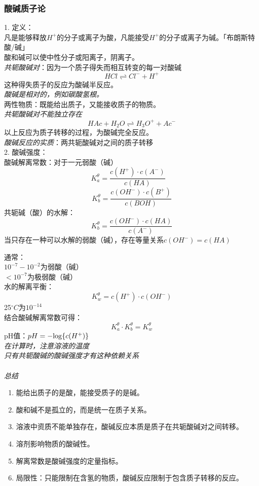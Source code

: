 \documentclass[utf8,a4paper,12pt]{ctexart}
\begin{document}
\subsubsection{酸碱质子论}
{\large 1. 定义：}\\
凡是能够释放$H^{+}$的分子或离子为酸，凡能接受$H^{+}$的分子或离子为碱。「布朗斯特酸/碱」\\
酸和碱可以使中性分子或阳离子，阴离子。\\
\emph{共轭酸碱对}：因为一个质子得失而相互转变的每一对酸碱
\[
HCl \rightleftharpoons Cl^{-} + H^{+}
\]
这种得失质子的反应为酸碱半反应。\\
\emph{酸碱是相对的，例如碳酸氢根。}\\
两性物质：既能给出质子，又能接收质子的物质。\\
\emph{共轭酸碱对不能独立存在}
\[
HAc + H_{2}O \rightleftharpoons H_{3}O^{+} + Ac^{-}
\]
以上反应为质子转移的过程，为酸碱完全反应。\\
\emph{酸碱反应的实质}：两共轭酸碱对之间的质子转移\\
{\large 2. 酸碱强度：}\\
酸碱解离常数：对于一元弱酸（碱）
\begin{equation}
K^{\theta}_{a} = \frac{c(H^{+})\cdot c(A^{-})}{c(HA)}\quad
\end{equation}
\[
K^{\theta}_{b} = \frac{c(OH^{-})\cdot c(B^{+})}{c(BOH)}
\]
共轭碱（酸）的水解：
\[
K^{\theta}_{b} = \frac{c(OH^{-})\cdot c(HA)}{c(A^{-})}
\]
当只存在一种可以水解的弱酸（碱），存在等量关系$c(OH^{-}) = c(HA)$

通常：\\
$10^{-7} - 10^{-2}$为弱酸（碱）\\
$<10^{-7}$为极弱酸（碱）\\
水的解离平衡：
\begin{equation}
K^{\theta}_{w} = c(H^{+})\cdot c(OH^{-})
\end{equation}
25$^{\circ}C$为$10^{-14}$\\
结合酸碱解离常数可得：
\begin{equation}
K^{\theta}_{a} \cdot K^{\theta}_{b} = K^{\theta}_{w}
\end{equation}
pH值：$pH = -{\rm log}\{c(H^{+})\}$\\
\emph{在计算时，注意溶液的温度\\只有共轭酸碱的酸碱强度才有这种依赖关系}\\\\
\emph{总结}
\begin{enumerate}[1)]
\item 能给出质子的是酸，能接受质子的是碱。
\item 酸和碱不是孤立的，而是统一在质子关系。
\item 溶液中资质不能单独存在，酸碱反应本质是质子在共轭酸碱对之间转移。
\item 溶剂影响物质的酸碱性。
\item 解离常数是酸碱强度的定量指标。
\item 局限性：只能限制在含氢的物质，酸碱反应限制于包含质子转移的反应。
\end{enumerate}
\end{document}

